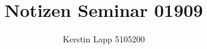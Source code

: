 \documentclass[11pt]{article}
\title{Notizen Seminar 01909}
\author{Kerstin Lapp 5105200}
\begin{document}






\nocite{*}






\end{document}
